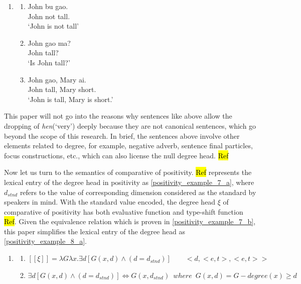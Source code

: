 \documentclass{ctexart}
\begin{document}
\begin{enumerate}
    \item \label{positivity_example_6}
    \begin{enumerate}
        \item \label{positivity_example_6_a}
        John bu gao. \\
        John not tall. \\
        `John is not tall' 

        \item \label{positivity_example_6_b}
        John gao ma? \\
        John tall? \\
        `Is John tall?' 

        \item \label{positivity_example_6_c}
        John gao, Mary ai. \\
        John tall, Mary short. \\
        `John is tall, Mary is short.' 

    \end{enumerate}
\end{enumerate}

This paper will not go into the reasons why sentences like above allow the dropping of \textit{hen}(`very') deeply because they are not canonical sentences, which go beyond the scope of this research. In brief, the sentences above involve other elements related to degree, for example, negative adverb, sentence final particles, focus constructions, etc., which can also license the null degree head. \hl{Ref}

Now let us turn to the semantics of comparative of positivity. \hl{Ref} represents the lexical entry of the degree head in positivity as \ref{positivity_example_7_a}, where $d_{stnd}$ refers to the value of corresponding dimension considered as the standard by speakers in mind. With the standard value encoded, the degree head $\xi$ of comparative of positivity has both evaluative function and type-shift function \hl{Ref}. Given the equivalence relation which is proven in \ref{positivity_example_7_b}, this paper simplifies the lexical entry of the degree head as \ref{positivity_example_8_a}.

\begin{enumerate}
    \item \label{positivity_example_7}
    \begin{enumerate}
        \item \label{positivity_example_7_a}
        $[\![\xi]\!]=\lambda G \lambda x. \exists d [G(x,d) \land (d=d_{stnd})] \qquad <d,<e,t>,<e,t>>$

        \item \label{positivity_example_7_b}
        $\exists d [G(x,d) \land (d=d_{stnd})] \Leftrightarrow G(x,d_{stnd}) \enspace where \enspace G(x,d) = G-degree(x) \geq d$

    \end{enumerate}
\end{enumerate}
\end{document}

